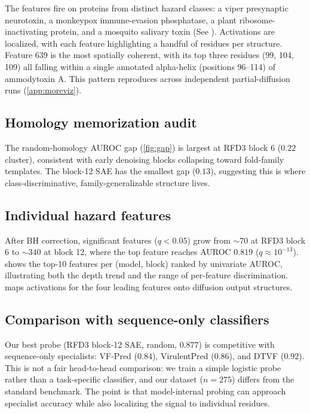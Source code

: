 \documentclass{article}
\begin{document}
The features fire on proteins from distinct hazard classes: a viper presynaptic neurotoxin, a monkeypox immune-evasion phosphatase, a plant ribosome-inactivating protein, and a mosquito salivary toxin (See ). Activations are localized, with each feature highlighting a handful of residues per structure. Feature 639 is the most spatially coherent, with its top three residues (99, 104, 109) all falling within a single annotated alpha-helix (positions 96--114) of ammodytoxin A. This pattern reproduces across independent partial-diffusion runs (\cref{app:moreviz}).

\subsection{Homology memorization audit}

The random-homology AUROC gap (\cref{fig:gap}) is largest at RFD3 block 6 ($0.22$ cluster), consistent with early denoising blocks collapsing toward fold-family templates. The block-12 SAE has the smallest gap ($0.13$), suggesting this is where class-discriminative, family-generalizable structure lives.


\subsection{Individual hazard features}

After BH correction, significant features ($q < 0.05$) grow from ${\sim}70$ at RFD3 block 6 to ${\sim}340$ at block 12, where the top feature reaches AUROC $0.819$ ($q \approx 10^{-13}$).  shows the top-10 features per (model, block) ranked by univariate AUROC, illustrating both the depth trend and the range of per-feature discrimination.  maps activations for the four leading features onto diffusion output structures.

\subsection{Comparison with sequence-only classifiers}

Our best probe (RFD3 block-12 SAE, random, $0.877$) is competitive with sequence-only specialists: VF-Pred \cite{singh2024vfpred} ($0.84$), VirulentPred \cite{garg2008virulentpred} ($0.86$), and DTVF \cite{sun2024dtvf} ($0.92$). This is not a fair head-to-head comparison: we train a simple logistic probe rather than a task-specific classifier, and our dataset ($n = 275$) differs from the standard benchmark. The point is that model-internal probing can approach specialist accuracy while also localizing the signal to individual residues.
\end{document}
